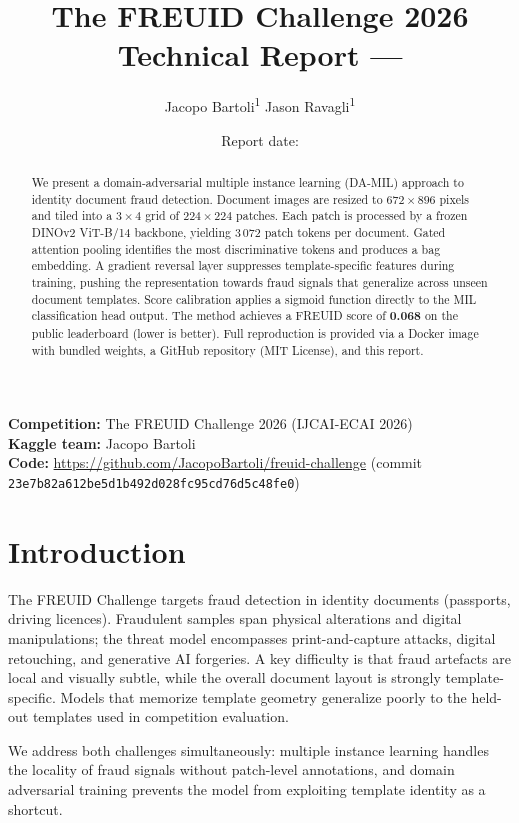 \documentclass[11pt,a4paper]{article}
\title{%
  \textbf{The FREUID Challenge 2026}\\[0.4em]
  \large Technical Report --- \teamname
}
\author{%
  Jacopo Bartoli\textsuperscript{1} \quad
  Jason Ravagli\textsuperscript{1}\\[0.3em]
  \small\texttt{\contactemail}
}
\date{Report date: \reportdate}
\newcommand{\kaggleteam}{Jacopo Bartoli}
\begin{document}
\maketitle

\begin{abstract}
We present a domain-adversarial multiple instance learning (DA-MIL) approach to identity document fraud detection. Document images are resized to $672\times896$ pixels and tiled into a $3\times4$ grid of $224\times224$ patches. Each patch is processed by a frozen DINOv2 ViT-B/14 backbone, yielding 3\,072 patch tokens per document. Gated attention pooling identifies the most discriminative tokens and produces a bag embedding. A gradient reversal layer suppresses template-specific features during training, pushing the representation towards fraud signals that generalize across unseen document templates. Score calibration applies a sigmoid function directly to the MIL classification head output. The method achieves a FREUID score of \textbf{0.068} on the public leaderboard (lower is better). Full reproduction is provided via a Docker image with bundled weights, a GitHub repository (MIT License), and this report.
\end{abstract}

\noindent\textbf{Competition:} The FREUID Challenge 2026 (IJCAI-ECAI 2026)~\cite{freuid2026}\\
\textbf{Kaggle team:} \kaggleteam\\
\textbf{Code:} \url{https://github.com/JacopoBartoli/freuid-challenge} (commit \texttt{23e7b82a612be5d1b492d028fc95cd76d5c48fe0})\\

\section{Introduction}
\label{sec:intro}

The FREUID Challenge targets fraud detection in identity documents (passports, driving licences). Fraudulent samples span physical alterations and digital manipulations; the threat model encompasses print-and-capture attacks, digital retouching, and generative AI forgeries. A key difficulty is that fraud artefacts are local and visually subtle, while the overall document layout is strongly template-specific. Models that memorize template geometry generalize poorly to the held-out templates used in competition evaluation.

We address both challenges simultaneously: multiple instance learning handles the locality of fraud signals without patch-level annotations, and domain adversarial training prevents the model from exploiting template identity as a shortcut.
\end{document}
